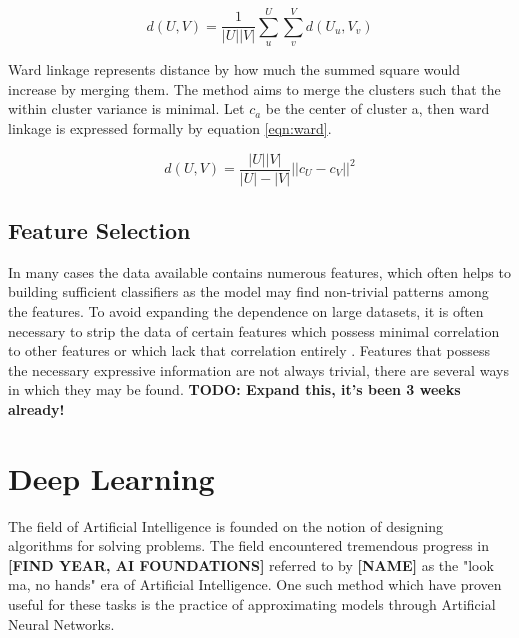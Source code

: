 \begin{equation}
\label{eqn:average}
d(U, V) = \frac{1}{|U||V|}\sum\limits_u^U \sum\limits_v^V  d(U_u, V_v)
\end{equation}

Ward linkage represents distance by how much the summed square would increase by merging them. The method aims to merge the clusters such that the within cluster variance is minimal. Let $c_a$ be the center of cluster a, then ward linkage is expressed formally by equation \ref{eqn:ward}\cite{shalizi2009distances}.


\begin{equation}
\label{eqn:ward}
d(U, V) = \frac{|U||V|}{|U|-|V|}||c_U - c_V||^2
\end{equation}



\subsection{Feature Selection}

In many cases the data available contains numerous features, which often helps to building sufficient classifiers as the model may find non-trivial patterns among the features. To avoid expanding the dependence on large datasets, it is often necessary to strip the data of certain features which possess minimal correlation to other features or which lack that correlation entirely \cite{dash1997feature}. Features that possess the necessary expressive information are not always trivial, there are several ways in which they may be found. \textbf{TODO: Expand this, it's been 3 weeks already!}

\section{Deep Learning}

The field of Artificial Intelligence is founded on the notion of designing algorithms for solving problems. The field encountered tremendous progress in \textbf{[FIND YEAR, AI FOUNDATIONS]} referred to by \textbf{[NAME]} as the "look ma, no hands" era of Artificial Intelligence. One such method which have proven useful for these tasks is the practice of approximating models through Artificial Neural Networks.

